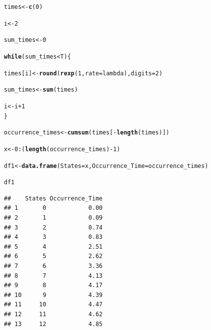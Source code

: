 \documentclass[11pt, a4paper]{article}\usepackage[]{graphicx}\usepackage[]{xcolor}
\makeatletter
\newcommand{\hlnum}[1]{\textcolor[rgb]{0.686,0.059,0.569}{#1}}%
\newcommand{\hlopt}[1]{\textcolor[rgb]{0,0,0}{#1}}%
\newcommand{\hldef}[1]{\textcolor[rgb]{0.345,0.345,0.345}{#1}}%
\newcommand{\hlkwa}[1]{\textcolor[rgb]{0.161,0.373,0.58}{\textbf{#1}}}%
\newcommand{\hlkwb}[1]{\textcolor[rgb]{0.69,0.353,0.396}{#1}}%
\newcommand{\hlkwc}[1]{\textcolor[rgb]{0.333,0.667,0.333}{#1}}%
\newcommand{\hlkwd}[1]{\textcolor[rgb]{0.737,0.353,0.396}{\textbf{#1}}}%
\newenvironment{kframe}{%
 \def\at@end@of@kframe{}%
 \ifinner\ifhmode%
  \def\at@end@of@kframe{\end{minipage}}%
  \begin{minipage}{\columnwidth}%
 \fi\fi%
 \def\FrameCommand##1{\hskip\@totalleftmargin \hskip-\fboxsep
 \colorbox{shadecolor}{##1}\hskip-\fboxsep
     \hskip-\linewidth \hskip-\@totalleftmargin \hskip\columnwidth}%
 \MakeFramed {\advance\hsize-\width
   \@totalleftmargin\z@ \linewidth\hsize
   \@setminipage}}%
 {\par\unskip\endMakeFramed%
 \at@end@of@kframe}
\newenvironment{knitrout}{}{} %
\makeatother
\begin{document}
\begin{knitrout}
\color{fgcolor}\begin{kframe}
\begin{alltt}
\hldef{times} \hlkwb{<-} \hlkwd{c}\hldef{(}\hlnum{0}\hldef{)}

\hldef{i} \hlkwb{<-} \hlnum{2}

\hldef{sum_times} \hlkwb{<-} \hlnum{0}

\hlkwa{while}\hldef{(sum_times} \hlopt{<} \hldef{T)\{}

  \hldef{times[i]} \hlkwb{<-} \hlkwd{round}\hldef{(}\hlkwd{rexp}\hldef{(}\hlnum{1}\hldef{,} \hlkwc{rate} \hldef{= lambda),} \hlkwc{digits} \hldef{=} \hlnum{2}\hldef{)}

  \hldef{sum_times} \hlkwb{<-} \hlkwd{sum}\hldef{(times)}

  \hldef{i} \hlkwb{<-} \hldef{i} \hlopt{+} \hlnum{1}
\hldef{\}}

\hldef{occurrence_times} \hlkwb{<-} \hlkwd{cumsum}\hldef{(times[}\hlopt{-}\hlkwd{length}\hldef{(times)])}

\hldef{x} \hlkwb{<-} \hlnum{0}\hlopt{:}\hldef{(}\hlkwd{length}\hldef{(occurrence_times)}\hlopt{-}\hlnum{1}\hldef{)}
\end{alltt}
\end{kframe}
\end{knitrout}

\begin{knitrout}
\color{fgcolor}\begin{kframe}
\begin{alltt}
\hldef{df1} \hlkwb{<-} \hlkwd{data.frame}\hldef{(}\hlkwc{States} \hldef{= x,} \hlkwc{Occurrence_Time} \hldef{= occurrence_times)}
\end{alltt}
\end{kframe}
\end{knitrout}


\begin{knitrout}
\color{fgcolor}\begin{kframe}
\begin{alltt}
\hldef{df1}
\end{alltt}
\begin{verbatim}
##    States Occurrence_Time
## 1       0            0.00
## 2       1            0.09
## 3       2            0.74
## 4       3            0.83
## 5       4            2.51
## 6       5            2.62
## 7       6            3.36
## 8       7            4.13
## 9       8            4.17
## 10      9            4.39
## 11     10            4.47
## 12     11            4.62
## 13     12            4.85
\end{verbatim}
\end{kframe}
\end{knitrout}
\end{document}
